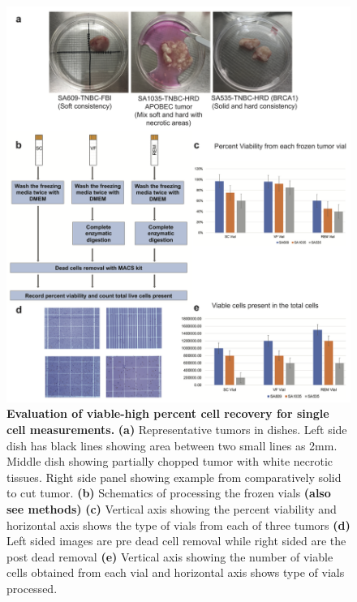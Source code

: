 \begin{figure}
	\centering
	\includegraphics[width=\textwidth]{Figures/cellviability2.png}
	\caption[Evaluation of viable-high percent cell recovery for single cell measurements]
	{\small
	    \textbf{Evaluation of viable-high percent cell recovery for single cell measurements.}
	    \textbf{(a)} Representative tumors in dishes. Left side dish has black lines showing area between two small lines as 2mm. Middle dish showing partially chopped tumor with white necrotic tissues. Right side panel showing example from comparatively solid to cut tumor.
	    \textbf{(b)} Schematics of processing the frozen vials \textbf{(also see methods)}
	    \textbf{(c)} Vertical axis showing the percent viability and horizontal axis shows the type of vials from each of three tumors  \textbf{(d)} Left sided images are pre dead cell removal while right sided are the post dead removal \textbf{(e)} Vertical axis showing the number of viable cells obtained from each vial and horizontal axis shows type of vials processed.
	}
	\label{fig:cellviability}
\end{figure}


